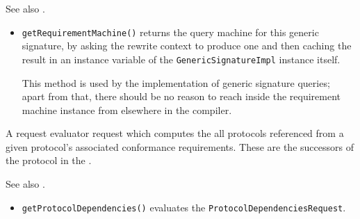 \documentclass[../generics]{subfiles}
\begin{document}
See also .
\begin{itemize}
\item \texttt{getRequirementMachine()} returns the query machine for this generic signature, by asking the rewrite context to produce one and then caching the result in an instance variable of the \texttt{GenericSignatureImpl} instance itself.

This method is used by the implementation of generic signature queries; apart from that, there should be no reason to reach inside the requirement machine instance from elsewhere in the compiler.
\end{itemize}

A request evaluator request which computes the  all protocols referenced from a given protocol's associated conformance requirements. These are the successors of the protocol in the .

See also .
\begin{itemize}
\item \texttt{getProtocolDependencies()} evaluates the \texttt{ProtocolDependenciesRequest}.
\end{itemize}
\end{document}

